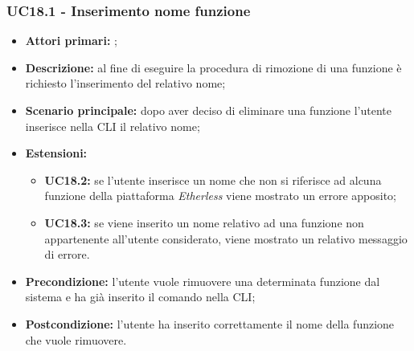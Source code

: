 \subsubsection{UC18.1 - Inserimento nome funzione}
\begin{itemize}
	\item \textbf{Attori primari:} \us{};
	\item \textbf{Descrizione:} al fine di eseguire la procedura di rimozione di una funzione è richiesto l’inserimento del relativo nome; 
	\item \textbf{Scenario principale:} dopo aver deciso di eliminare una funzione l’utente inserisce nella CLI il relativo nome; 
	\item \textbf{Estensioni:} 
	\begin{itemize}
		\item \textbf{UC18.2:} se l’utente inserisce un nome che non si riferisce ad alcuna funzione della piattaforma \textit{Etherless} viene mostrato un errore apposito;  
		\item \textbf{UC18.3:} se viene inserito un nome relativo ad una funzione non appartenente all’utente considerato, viene mostrato un relativo messaggio di errore. 
	\end{itemize}
	\item \textbf{Precondizione:} l’utente vuole rimuovere una determinata funzione dal sistema e ha già inserito il comando \delete{} nella CLI;  
	\item \textbf{Postcondizione:} l’utente ha inserito correttamente il nome della funzione che vuole rimuovere.  
\end{itemize}